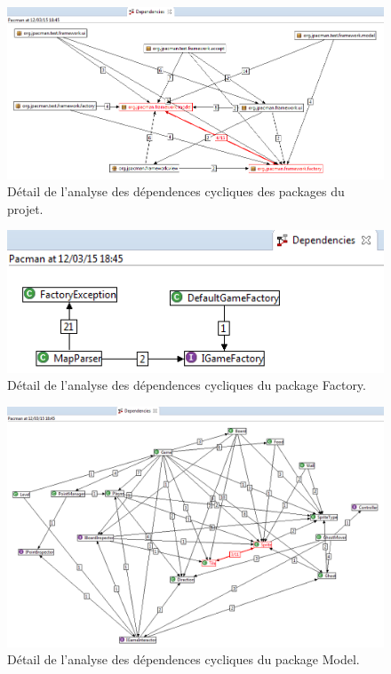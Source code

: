 \documentclass[12pt,a4paper,final]{article}
\begin{document}
\begin{figure}
	\centering
	\includegraphics[width=\textwidth]{images/DependenciesPackages.png}
	\caption{\label{deadcode}Détail de l'analyse des dépendences cycliques des packages du projet.}
\end{figure}

\begin{figure}
	\centering
	\includegraphics[width=\textwidth]{images/DependenciesFactory.png}
	\caption{\label{deadcode}Détail de l'analyse des dépendences cycliques du package Factory.}
\end{figure}

\begin{figure}
	\centering
	\includegraphics[width=\textwidth]{images/DependenciesModel.png}
	\caption{\label{deadcode}Détail de l'analyse des dépendences cycliques du package Model.}
\end{figure}
\end{document}
